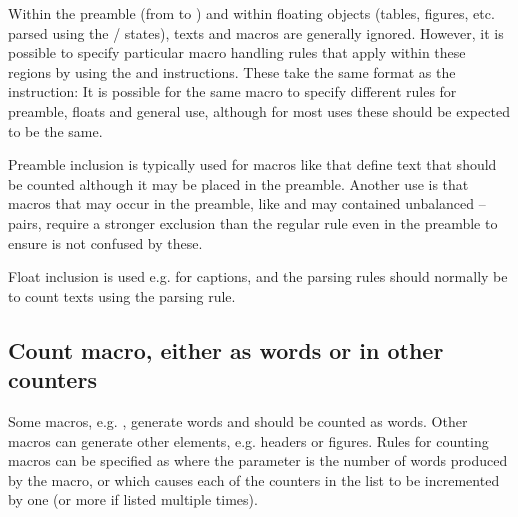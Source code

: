 \documentclass{article}
\begin{document}
Within the preamble (from  to ) and within floating objects (tables, figures, etc. parsed using the / states), texts and macros are generally ignored. However, it is possible to specify particular macro handling rules that apply within these regions by using the  and  \TeXcount{} instructions. These take the same format as the  instruction:
It is possible for the same macro to specify different rules for preamble, floats and general use, although for most uses these should be expected to be the same.

Preamble inclusion is typically used for macros like  that define text that should be counted although it may be placed in the preamble. Another use is that macros that may occur in the preamble, like  and may contained unbalanced -- pairs, require a stronger exclusion than the regular  rule even in the preamble to ensure \TeXcount{} is not confused by these.

Float inclusion is used e.g. for captions, and the parsing rules should normally be to count texts using the  parsing rule.


\subsection{Count macro, either as words or in other counters}

Some macros, e.g. , generate words and should be counted as words. Other macros can generate other elements, e.g. headers or figures. Rules for counting macros can be specified as
where the parameter is the number of words produced by the macro, or
which causes each of the counters in the list to be incremented by one (or more if listed multiple times).
\end{document}
